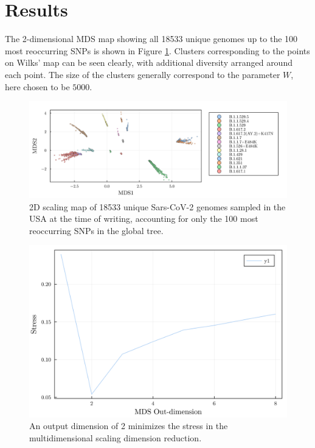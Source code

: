 \documentclass{article}
\begin{document}
\section{Results}
    The 2-dimensional MDS map showing all 18533 unique genomes up to the 100 most reoccurring SNPs is shown in Figure \ref{map}.
    Clusters corresponding to the points on Wilks' map can be seen clearly, with additional diversity arranged around each point.
    The size of the clusters generally correspond to the parameter $W$, here chosen to be $5000$.


\begin{figure}
    \includegraphics[width=\textwidth]{../SarsEvoModel/plots/homoplasy_usa/homoplasy_usa_mds_multidimensional_scaling.png}    
    \caption{2D scaling map of 18533 unique Sars-CoV-2 genomes sampled in the USA at the time of writing, accounting for only the 100 most reoccurring SNPs in the global tree.} 
    \label{map}
\end{figure}


\begin{figure}
    \includegraphics[width=\textwidth]{../SarsEvoModel/plots/combined_mds_stress.png}    
    \caption{An output dimension of 2 minimizes the stress in the multidimensional scaling dimension reduction.}
    \label{stress}
\end{figure}%
\end{document}
